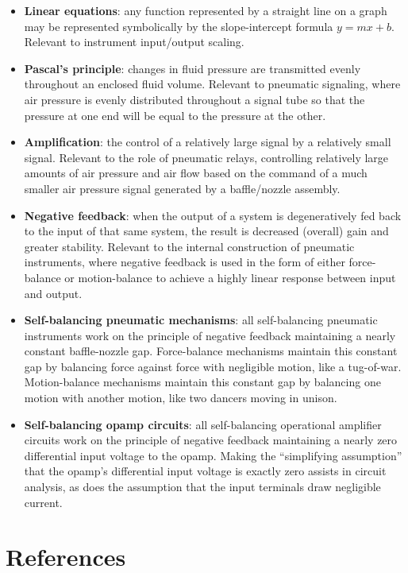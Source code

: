 \begin{itemize}
\item \textbf{Linear equations}: any function represented by a straight line on a graph may be represented symbolically by the slope-intercept formula $y = mx + b$.  Relevant to instrument input/output scaling.
\item \textbf{Pascal's principle}: changes in fluid pressure are transmitted evenly throughout an enclosed fluid volume.  Relevant to pneumatic signaling, where air pressure is evenly distributed throughout a signal tube so that the pressure at one end will be equal to the pressure at the other.
\item \textbf{Amplification}: the control of a relatively large signal by a relatively small signal.  Relevant to the role of pneumatic relays, controlling relatively large amounts of air pressure and air flow based on the command of a much smaller air pressure signal generated by a baffle/nozzle assembly.
\item \textbf{Negative feedback}: when the output of a system is degeneratively fed back to the input of that same system, the result is decreased (overall) gain and greater stability.  Relevant to the internal construction of pneumatic instruments, where negative feedback is used in the form of either force-balance or motion-balance to achieve a highly linear response between input and output.
\item \textbf{Self-balancing pneumatic mechanisms}: all self-balancing pneumatic instruments work on the principle of negative feedback maintaining a nearly constant baffle-nozzle gap.  Force-balance mechanisms maintain this constant gap by balancing force against force with negligible motion, like a tug-of-war.  Motion-balance mechanisms maintain this constant gap by balancing one motion with another motion, like two dancers moving in unison.
\item \textbf{Self-balancing opamp circuits}: all self-balancing operational amplifier circuits work on the principle of negative feedback maintaining a nearly zero differential input voltage to the opamp.  Making the ``simplifying assumption'' that the opamp's differential input voltage is exactly zero assists in circuit analysis, as does the assumption that the input terminals draw negligible current.
\end{itemize}








\filbreak
\section*{References}

